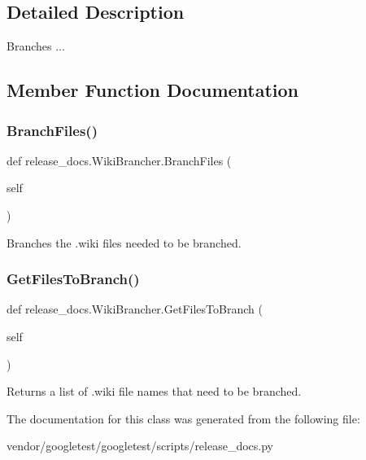 \subsection{Detailed Description}
\begin{DoxyVerb}Branches ...\end{DoxyVerb}
 

\subsection{Member Function Documentation}
\mbox{\label{classrelease__docs_1_1_wiki_brancher_a5ef284f7e1742f465ecd0c14d2667327}} 
\subsubsection{\texorpdfstring{Branch\+Files()}{BranchFiles()}}
{\footnotesize\ttfamily def release\+\_\+docs.\+Wiki\+Brancher.\+Branch\+Files (\begin{DoxyParamCaption}\item[{}]{self }\end{DoxyParamCaption})}

\begin{DoxyVerb}Branches the .wiki files needed to be branched.\end{DoxyVerb}
 \mbox{\label{classrelease__docs_1_1_wiki_brancher_a05fc4282f501fb0210ecb33fd1d209a6}} 
\subsubsection{\texorpdfstring{Get\+Files\+To\+Branch()}{GetFilesToBranch()}}
{\footnotesize\ttfamily def release\+\_\+docs.\+Wiki\+Brancher.\+Get\+Files\+To\+Branch (\begin{DoxyParamCaption}\item[{}]{self }\end{DoxyParamCaption})}

\begin{DoxyVerb}Returns a list of .wiki file names that need to be branched.\end{DoxyVerb}
 

The documentation for this class was generated from the following file\+:\begin{DoxyCompactItemize}
\item 
vendor/googletest/googletest/scripts/release\+\_\+docs.\+py\end{DoxyCompactItemize}
